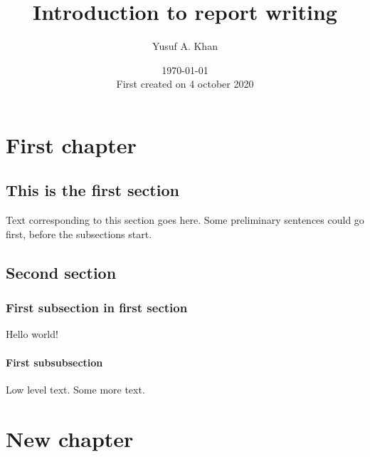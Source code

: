 \documentclass[12pt,a4paper]{report}
\title{Introduction to report writing}
\author{Yusuf A. Khan}
\date{\today\\ First created on 4 october 2020}
\begin{document}
\maketitle
\tableofcontents
\chapter{First chapter}

\section{This is the first section}
Text corresponding to this section goes here.  Some preliminary
sentences could go first, before the subsections start. 

\section{Second section}


\subsection{First subsection in first section}
Hello world!


\subsubsection{First subsubsection}
Low level text.  Some more text.
\appendix
\chapter{New chapter}
\end{document}
